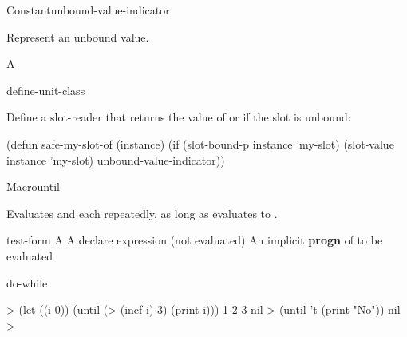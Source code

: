 \documentclass[10pt,twoside,english,pdftex]{article}
\begin{document}

\begin{functiondoc}{Constant}{unbound-value-indicator}{}%

\fnsyntax

\fnpurpose Represent an unbound value.

\fnpackage {}

\fnmodule {}

\fnvaluetype A 

\fnvalue {}

\begin{alsos}{define-unit-class}
\end{alsos}

\fnexample Define a slot-reader  that returns the value of
 or  if the slot
is unbound:
%
\W\supp
\begin{example}
  (defun safe-my-slot-of (instance)
    (if (slot-bound-p instance 'my-slot)
        (slot-value instance 'my-slot)
        unbound-value-indicator))
\end{example}

\end{functiondoc}


\begin{functiondoc}{Macro}{until}{ 
    }
%
  
\fnsyntax

\fnpurpose Evaluates  and each  repeatedly,
as long as  evaluates to \nil.

\fnpackage {}

\fnmodule {}

\fnargs
\begin{args}{test-form}
 A 
\arg[declaration] A declare expression (not evaluated)
\arg[forms] An implicit \textbf{progn} of  to be evaluated
\end{args}

\begin{alsos}{do-while}
\also[do-until]
\also[do-while]
\also[while]
\end{alsos}

\fnexamples
%
\W\supp
\begin{example}
  > (let ((i 0)) 
      (until (> (incf i) 3) 
         (print i)))
  1 
  2 
  3 
  nil\goodpagebreak
  > (until 't (print "No"))
  nil
  >
\end{example}

\end{functiondoc}
\end{document}
